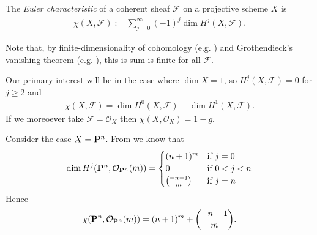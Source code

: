 \documentclass[12pt]{ociamthesis}  %
\begin{document}
\begin{definition}
  The \emph{Euler characteristic} of a coherent sheaf $\mathcal F$
  on a projective scheme $X$ is
  \begin{align*}
    \chi (X,\mathcal F) := \sum_{j=0}^\infty (-1)^j \dim H^j (X,\mathcal F).
  \end{align*}
\end{definition}

Note that, by finite-dimensionality of cohomology
(e.g. \cite[\href{https://stacks.math.columbia.edu/tag/02O6}{Tag 02O6}]{stacks-project}) and Grothendieck's vanishing theorem (e.g.
\cite[III Theorem 2.7]{hartshorne1977}), this is sum is finite for
all $\mathcal F$.

\begin{example}
  Our primary interest will be in the case where
  $\dim X = 1$, so $H^j(X,\mathcal F)=0$ for $j\geq 2$ and
  \begin{align*}
    \chi (X,\mathcal F) = \dim H^0(X,\mathcal F)-\dim H^1(X,\mathcal F).
  \end{align*}
  If we moreoever take $\mathcal F=\mathcal O_X$ then
  $\chi (X,\mathcal O_X) = 1 - g$. 
\end{example}

\begin{example}
  Consider the case $X=\mathbf{P}^{n}_{}$.
  From \missingcitation we know that
  \begin{align*}
    \dim H^j(\mathbf{P}^{n}_{},\mathcal O_{\mathbf{P}^{n}_{}}(m)) =
    \begin{cases}
      (n+1)^m & \text{if }j = 0 \\
      0 &\text{if }0<j<n \\
      \binom{-n-1}{m} &\text{if }j=n
    \end{cases}
  \end{align*}
  Hence 
  \begin{align*}
    \chi(\mathbf{P}^{n}_{},\mathcal O_{\mathbf{P}^{n}_{}}(m))
    = (n+1)^m + \binom{-n-1}{m}.
  \end{align*}
\end{example}

\begin{lemma}
\end{lemma}

\begin{lemma}
\end{lemma}
\end{document}
